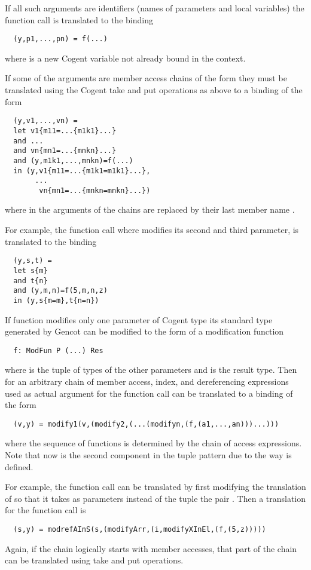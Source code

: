 If all such arguments are identifiers (names of parameters and local variables) the function call is translated to
the binding
\begin{verbatim}
  (y,p1,...,pn) = f(...)
\end{verbatim}
where  is a new Cogent variable not already bound in the context.

If some of the arguments are member access chains of the form  they must be translated using the 
Cogent take and put operations as above to a binding of the form
\begin{verbatim}
  (y,v1,...,vn) = 
  let v1{m11=...{m1k1}...}
  and ... 
  and vn{mn1=...{mnkn}...}
  and (y,m1k1,...,mnkn)=f(...)
  in (y,v1{m11=...{m1k1=m1k1}...},
       ...
        vn{mn1=...{mnkn=mnkn}...})
\end{verbatim}
where in the arguments of  the chains are replaced by their last member name .

For example, the function call  where  modifies its second and third parameter, is translated
to the binding
\begin{verbatim}
  (y,s,t) = 
  let s{m}
  and t{n}
  and (y,m,n)=f(5,m,n,z)
  in (y,s{m=m},t{n=n})
\end{verbatim}

If function  modifies only one parameter  of Cogent type  its standard type generated by
Gencot can be modified to the form of a modification function
\begin{verbatim}
  f: ModFun P (...) Res
\end{verbatim}
where  is the tuple of types of the other parameters and  is the result type. Then for an arbitrary
chain of member access, index, and dereferencing expressions used as actual argument for  the function call 
can be translated to a binding of the form
\begin{verbatim}
  (v,y) = modify1(v,(modify2,(...(modifyn,(f,(a1,...,an)))...)))
\end{verbatim}
where the sequence of  functions is determined by the chain of access expressions. Note
that now  is the second component in the tuple pattern due to the way  is defined.

For example, the function call  can be translated by first modifying the translation of 
 so that it takes as parameters instead of the tuple  the pair . Then a translation
for the function call is
\begin{verbatim}
  (s,y) = modrefAInS(s,(modifyArr,(i,modifyXInEl,(f,(5,z)))))
\end{verbatim}
Again, if the chain logically starts with member accesses, that part of the chain can be translated using take and put operations.


